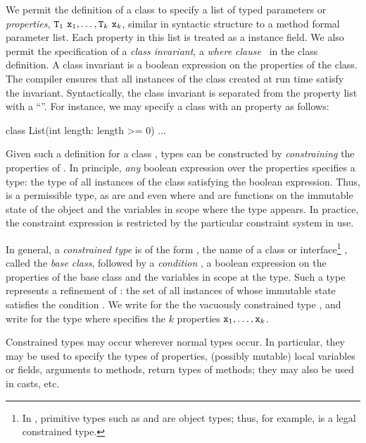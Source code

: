 We permit the definition of a class  to specify
a list of typed parameters or {\em properties},
${\tt T}_1~{\tt x}_1, \dots, {\tt T}_k~{\tt x}_k$,
similar in syntactic structure to a method formal parameter list.
%
Each property in this list is treated as  a   instance field.
%
We also permit the
specification of a {\em class invariant}, a
{\em where clause}~\cite{where-clauses}
in the class definition. A class invariant
is a boolean expression on the properties of the class.
The compiler ensures that all
instances of the class created at run time satisfy the invariant.
%
Syntactically, the class invariant is separated from the
property list with a ``\xcd{:}''. 
%
For instance, we may specify a class  with an
 property as follows:
\begin{displayxten}
class List(int length: length >= 0) {...}
\end{displayxten}
Given such a definition for a class , types can be
constructed by {\em constraining} the properties of .  In
principle, {\em any} boolean expression over the properties
specifies a type: the type of all instances of the class
satisfying the boolean expression. Thus, 
is a permissible type, as are  and
even  where  and 
are functions on the immutable state of the  object
and the variables in scope where the type appears.
In practice, the constraint expression is restricted by the
particular constraint system in use.

In general, a {\em constrained type} is of the form ,
the name of a class or interface\footnote{In \Xten{}, primitive
types such as  and  are object types; thus,
for example,  is a legal constrained type.}
, called the {\em base class}, followed
by a {\em condition} ,
a boolean expression on the properties of the
base class and the  variables in scope at the type.
Such a type represents a refinement of : the set of all
instances of  whose immutable state satisfies the
condition .
%
We write  for the
the vacuously constrained type , and
write
 for
the type
where  specifies the $k$ properties
${\tt x}_1,\ldots,{\tt x}_k$.

Constrained types may occur wherever normal types occur. In
particular, they may be used to specify the types of properties,
(possibly mutable) local variables or fields,
arguments to methods, return types of methods; they may also be
used in casts, etc.

